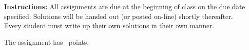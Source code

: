 \documentclass[12pt]{exam}
\begin{document}
\extrawidth{0.5in} \extrafootheight{-0.75in} \pagestyle{headandfoot}
\headrule {} \footrule {}

\addpoints

\noindent \textbf{Instructions:} All assignments are due at the
beginning of class on the due date specified.  Solutions will be
handed out (or posted on-line) shortly thereafter.  Every student
must write up their own solutions in their own manner.


\noindent The assignment has \numpoints\ points.
\end{document}
